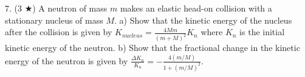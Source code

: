 7. (3 $\bigstar$) A neutron of mass $m$ makes an elastic head-on collision with a stationary nucleus of mass $M$. a) Show that the kinetic energy of the nucleus after the collision is given by $K_{nucleus} = \frac{4Mm}{(m+M)^2}K_n$ where $K_n$ is the initial kinetic energy of the neutron. b) Show that the fractional change in the kinetic energy of the neutron is given by $\frac{\Delta K_n}{K_n} = -\frac{4(m/M)}{1+(m/M)^2}$.
\pagebreak